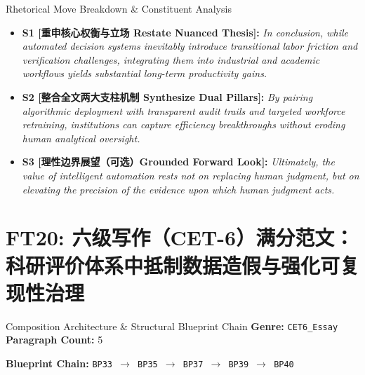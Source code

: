 \begin{TipBox}{Rhetorical Move Breakdown \& Constituent Analysis}
\begin{itemize}[leftmargin=1.5em]
  \item \textbf{S1 [重申核心权衡与立场 Restate Nuanced Thesis]:} \textit{In conclusion, while automated decision systems inevitably introduce transitional labor friction and verification challenges, integrating them into industrial and academic workflows yields substantial long-term productivity gains.}\par{}
  \item \textbf{S2 [整合全文两大支柱机制 Synthesize Dual Pillars]:} \textit{By pairing algorithmic deployment with transparent audit trails and targeted workforce retraining, institutions can capture efficiency breakthroughs without eroding human analytical oversight.}\par{}
  \item \textbf{S3 [理性边界展望（可选）Grounded Forward Look]:} \textit{Ultimately, the value of intelligent automation rests not on replacing human judgment, but on elevating the precision of the evidence upon which human judgment acts.}\par{}
\end{itemize}
\end{TipBox}
\medskip
\clearpage
\section{FT20: 六级写作（CET-6）满分范文：科研评价体系中抵制数据造假与强化可复现性治理}\label{comp:FT20}
\begin{ConceptBox}{Composition Architecture \& Structural Blueprint Chain}
\textbf{Genre:} \texttt{CET6\_Essay} \quad \textbf{Paragraph Count:} 5\par
\textbf{Blueprint Chain:} \texttt{BP33 $\to$ BP35 $\to$ BP37 $\to$ BP39 $\to$ BP40}
\end{ConceptBox}
